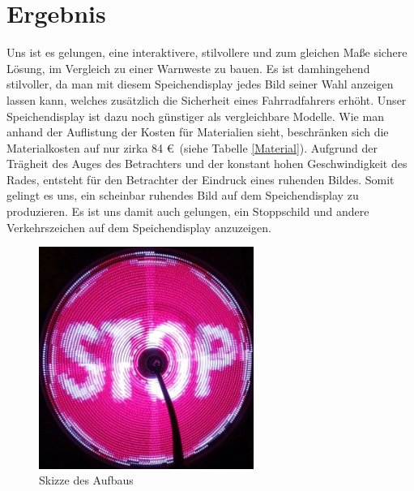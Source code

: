 \documentclass [a4paper, 11pt] {article}
\begin{document}
\section{Ergebnis}
Uns ist es gelungen, eine interaktivere, stilvollere und zum gleichen Maße sichere Lösung, im Vergleich zu einer Warnweste zu bauen. Es ist damhingehend stilvoller, da man mit diesem Speichendisplay jedes Bild seiner Wahl anzeigen lassen kann, welches zusätzlich die Sicherheit eines Fahrradfahrers erhöht.
Unser Speichendisplay ist dazu noch günstiger als vergleichbare Modelle. Wie man anhand der Auflistung der Kosten für Materialien sieht, beschränken sich die Materialkosten auf nur zirka 84 \euro\ (siehe Tabelle \ref{Material}). Aufgrund der Trägheit des Auges des Betrachters und der konstant hohen Geschwindigkeit des Rades, entsteht für den Betrachter der Eindruck eines ruhenden Bildes. Somit gelingt es uns, ein scheinbar ruhendes Bild auf dem Speichendisplay zu produzieren. Es ist uns damit auch gelungen, ein Stoppschild und andere Verkehrszeichen auf dem Speichendisplay anzuzeigen.
\begin{figure}[h]
	\centering
	\includegraphics[width=7cm]{Stopschild.png}
	\caption{Skizze des Aufbaus}
\end{figure}
\end{document}
